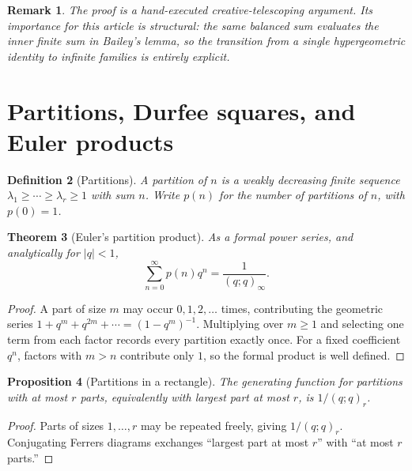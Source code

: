 \documentclass[11pt]{article}
\theoremstyle{blueplain}
\newtheorem{theorem}{Theorem}[section]
\newtheorem{proposition}[theorem]{Proposition}
\theoremstyle{bluedef}
\newtheorem{definition}[theorem]{Definition}
\newtheorem{remark}[theorem]{Remark}
\begin{document}
\begin{remark}
The proof is a hand-executed creative-telescoping argument.  Its importance for this article is structural: the same balanced sum evaluates the inner finite sum in Bailey's lemma, so the transition from a single hypergeometric identity to infinite families is entirely explicit.
\end{remark}

\section{Partitions, Durfee squares, and Euler products}

\begin{definition}[Partitions]
A partition of $n$ is a weakly decreasing finite sequence $\lambda_1\ge\cdots\ge\lambda_r\ge1$ with sum $n$.  Write $p(n)$ for the number of partitions of $n$, with $p(0)=1$.
\end{definition}

\begin{theorem}[Euler's partition product]\label{thm:partition-product}
As a formal power series, and analytically for $|q|<1$,
\begin{equation}\label{eq:partition-product}
\sum_{n=0}^{\infty}p(n)q^n=\frac1{(q;q)_\infty}.
\end{equation}
\end{theorem}

\begin{proof}
A part of size $m$ may occur $0,1,2,\ldots$ times, contributing the geometric series
\(
1+q^m+q^{2m}+\cdots=(1-q^m)^{-1}.
\)
Multiplying over $m\ge1$ and selecting one term from each factor records every partition exactly once.  For a fixed coefficient $q^n$, factors with $m>n$ contribute only $1$, so the formal product is well defined.
\end{proof}

\begin{proposition}[Partitions in a rectangle]\label{prop:rectangle-partitions}
The generating function for partitions with at most $r$ parts, equivalently with largest part at most $r$, is $1/(q;q)_r$.
\end{proposition}

\begin{proof}
Parts of sizes $1,\ldots,r$ may be repeated freely, giving $1/(q;q)_r$.  Conjugating Ferrers diagrams exchanges ``largest part at most $r$'' with ``at most $r$ parts.''
\end{proof}
\end{document}
